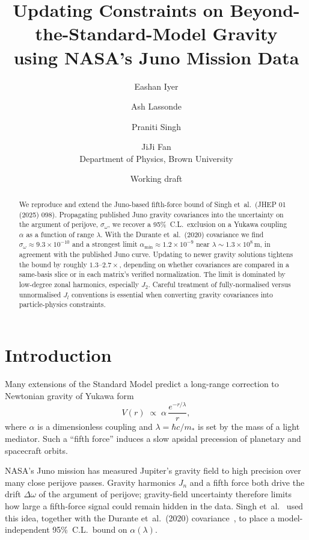 \documentclass[11pt,a4paper]{article}
\title{Updating Constraints on Beyond-the-Standard-Model Gravity\\
using NASA's Juno Mission Data}
\author{Eashan Iyer \and Ash Lassonde \and Praniti Singh \and JiJi Fan\\
\small Department of Physics, Brown University}
\date{Working draft}
\begin{document}
\maketitle

\begin{abstract}
We reproduce and extend the Juno-based fifth-force bound of Singh et~al.\
(JHEP 01 (2025) 098). Propagating published Juno gravity covariances into the
uncertainty on the argument of perijove, \(\sigma_\omega\), we recover a
95\%~C.L.\ exclusion on a Yukawa coupling \(\alpha\) as a function of range
\(\lambda\). With the Durante et~al.\ (2020) covariance we find
\(\sigma_\omega \approx 9.3\times10^{-10}\) and a strongest limit
\(\alpha_{\min}\approx 1.2\times10^{-9}\) near
\(\lambda\sim 1.3\times10^{8}\,\mathrm{m}\), in agreement with the published
Juno curve. Updating to newer gravity solutions tightens the bound by roughly
\(1.3\)--\(2.7\times\), depending on whether covariances are compared in a
same-basis slice or in each matrix's verified normalization. The limit is
dominated by low-degree zonal harmonics, especially \(J_2\). Careful treatment
of fully-normalised versus unnormalised \(J_l\) conventions is essential when
converting gravity covariances into particle-physics constraints.
\end{abstract}

\tableofcontents
\newpage

\section{Introduction}

Many extensions of the Standard Model predict a long-range correction to
Newtonian gravity of Yukawa form
\begin{equation}
  V(r)\;\propto\;\alpha\,\frac{e^{-r/\lambda}}{r},
\end{equation}
where \(\alpha\) is a dimensionless coupling and
\(\lambda=\hbar c/m_*\) is set by the mass of a light mediator. Such a
``fifth force'' induces a slow apsidal precession of planetary and spacecraft
orbits.

NASA's Juno mission has measured Jupiter's gravity field to high precision over
many close perijove passes. Gravity harmonics \(J_n\) and a fifth force both
drive the drift \(\Delta\omega\) of the argument of perijove; gravity-field
uncertainty therefore limits how large a fifth-force signal could remain hidden
in the data. Singh et~al.~\cite{Singh2025} used this idea, together with the
Durante et~al.\ (2020) covariance~\cite{Durante2020}, to place a
model-independent 95\%~C.L.\ bound on \(\alpha(\lambda)\).
\end{document}

